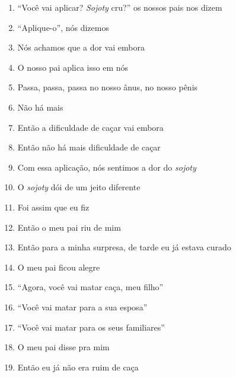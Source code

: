 \begin{enumerate}
 \item ``Você vai aplicar? \textit{Sojoty} cru?'' os nossos pais nos dizem

 \item ``Aplique-o'', nós dizemos

 \item Nós achamos que a dor vai embora

 \item O nosso pai aplica isso em nós

 \item Passa, passa, passa no nosso ânus, no nosso pênis

 \item Não há mais

 \item Então a dificuldade de caçar vai embora

 \item Então não há mais dificuldade de caçar

 \item Com essa aplicação, nós sentimos a dor do \textit{sojoty}

 \item O \textit{sojoty} dói de um jeito diferente

 \begin{center}\end{center}

 \item Foi assim que eu fiz

 \item Então o meu pai riu de mim

 \item Então para a minha surpresa, de tarde eu já estava curado

 \item O meu pai ficou alegre

 \item ``Agora, você vai matar caça, meu filho''

 \item ``Você vai matar para a sua esposa''

 \item ``Você vai matar para os seus familiares''

 \item O meu pai disse pra mim

 \begin{center}\end{center}

 \item Então eu já não era ruim de caça


\end{enumerate}
